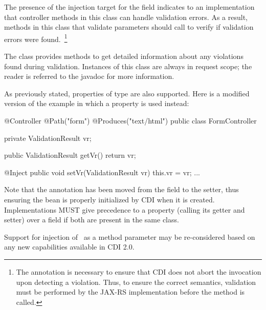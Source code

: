 The presence of the injection target for the field 
 indicates to an implementation that controller methods in this
class can handle validation errors. As a result, methods in this class
that validate parameters should call  to verify if
validation errors were found.~\footnote{The  
annotation is necessary to ensure that CDI does not abort the
invocation upon detecting a violation. Thus, to ensure the correct semantics, 
validation must be performed by the JAX-RS implementation before the method 
is called.}

The class  provides methods to get detailed information 
about any violations 
found during validation. Instances of this class are always in request
scope; the reader is referred to the javadoc for more information.

As previously stated, properties of type  
are also supported. Here is a modified version of the example in which
a property is used instead:

\begin{listing}{1}
@Controller
@Path("form")
@Produces("text/html")
public class FormController {

    private ValidationResult vr;
    
    public ValidationResult getVr() {
        return vr;
    }

    @Inject
    public void setVr(ValidationResult vr) {
        this.vr = vr;
    }
    ...
}
\end{listing}

Note that the  annotation has been moved from the field to the setter,
thus ensuring the bean is properly initialized by CDI when it is
created. Implementations MUST give precedence to a property (calling its getter and
setter) over a field if both are present in the same class.
 
\begin{ednote}
Support for injection of \ValRes\ as a method parameter may be re-considered based on 
any new capabilities available in CDI 2.0.
\end{ednote}
